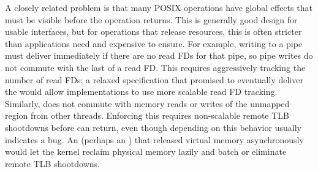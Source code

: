 A closely related problem is that many POSIX operations have global
effects that must be visible before the operation returns.
This is generally good design for usable interfaces, but for
operations that release resources, this is often stricter than
applications need and expensive to ensure. \cbend  For example, writing
to a pipe
must deliver  immediately if there are no
read FDs for that pipe, so pipe writes do not commute with the last
of a read FD.  This requires aggressively tracking the number of
read FDs; a relaxed specification that promised to eventually deliver the
 would allow implementations to use more scalable
read FD tracking.
Similarly,  does not commute
with memory reads or writes of the unmapped region from other threads.
Enforcing this requires non-scalable remote TLB shootdowns before 
can return, even though depending
on this behavior usually indicates a bug.  An  (perhaps an
) that released virtual memory asynchronously
would let the kernel
reclaim physical memory lazily and batch or eliminate remote TLB
shootdowns.


